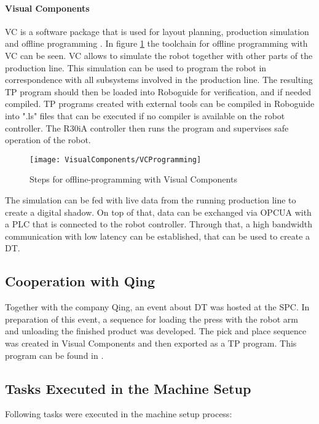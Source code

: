 \paragraph{Visual Components}
\ac{VC} is a software package that is used for layout planning, production simulation and offline programming%
. In figure \ref{fig:VCProgramming} the toolchain for offline programming with \ac{VC} can be seen.  \ac{VC} allows to simulate the robot together with other parts of the production line.  This simulation can be used to program the robot in correspondence with all subsystems involved in the production line. The resulting TP program should then be loaded into Roboguide for verification, and if needed compiled. TP programs created with external tools can be compiled in Roboguide into ".ls" files that can be executed if no compiler is available on the robot controller. The R30iA controller then runs the program and supervises safe operation of the robot.

\begin{figure}[H]
	\texttt{[image: VisualComponents/VCProgramming]}
	\caption{Steps for offline-programming with Visual Components}
	\label{fig:VCProgramming}
\end{figure}


The simulation can be fed with live data from the running production line to create a digital shadow. On top of that, data can be exchanged via \ac{OPCUA} with a \ac{PLC} that is connected to the robot controller. Through that, a high bandwidth communication with low latency can be established, that can be used to create a \ac{DT}.

\subsection{Cooperation with Qing}
Together with the company Qing, an event about \ac{DT} was hosted at the \ac{SPC}. In preparation of this event, a sequence for loading the press with the robot arm and unloading the finished product was developed. The  pick and place sequence was created in Visual Components and then exported as a TP program. This program can be found in %
.

\subsection{Tasks Executed in the Machine Setup}
Following tasks were executed in the machine setup process:

